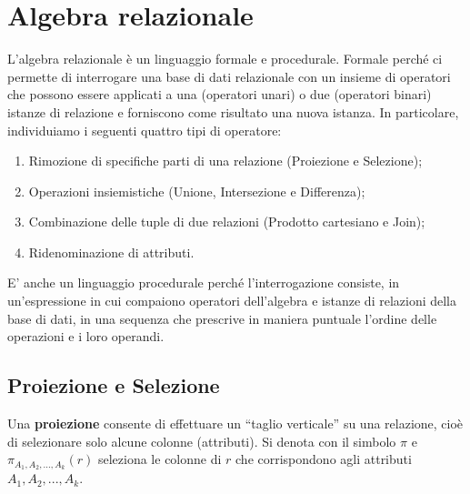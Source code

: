\chapter{Algebra relazionale}
L'algebra relazionale è un linguaggio formale e procedurale. Formale perché ci permette di interrogare una base di dati relazionale con un insieme di operatori che possono essere applicati a una (operatori unari) o due (operatori binari) istanze di relazione e forniscono come risultato una nuova istanza.
In particolare, individuiamo i seguenti quattro tipi di operatore: 
\begin{enumerate}
    \item Rimozione di specifiche parti di una relazione (Proiezione e Selezione);
    \item Operazioni insiemistiche (Unione, Intersezione e Differenza);
    \item Combinazione delle tuple di due relazioni (Prodotto cartesiano e Join);
    \item Ridenominazione di attributi.
\end{enumerate}

E' anche un linguaggio procedurale perché l'interrogazione consiste, in un'espressione in cui compaiono operatori dell'algebra e istanze di relazioni della base di dati, in una sequenza che prescrive in maniera puntuale l'ordine delle operazioni e i loro operandi.

\section{Proiezione e Selezione}

\begin{redbar}
    Una \textbf{proiezione} consente di effettuare un “taglio verticale” su una relazione, cioè di selezionare solo alcune colonne (attributi). Si denota con il simbolo $\pi$ e $\pi_{A_1,A_2,...,A_k}(r)$ seleziona le colonne di $r$ che corrispondono agli attributi $A_1,A_2,...,A_k$.
\end{redbar}


